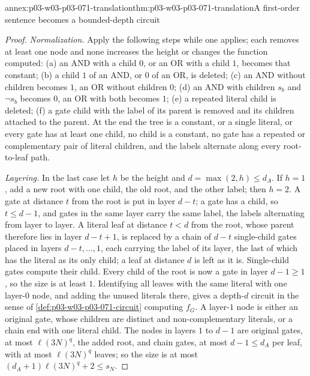 \begin{annexitem}{annex:p03-w03-p03-071-translation}{thm:p03-w03-p03-071-translation}{A first-order sentence becomes a bounded-depth circuit}
\begin{proof}
\emph{Normalization.}  Apply the following steps while one applies; each
removes at least one node and none increases the height or changes the
function computed: (a) an AND with a child \(0\), or an OR with a child
\(1\), becomes that constant; (b) a child \(1\) of an AND, or \(0\) of an OR,
is deleted; (c) an AND without children becomes \(1\), an OR without
children \(0\); (d) an AND with children \(s_b\) and \(\neg s_b\) becomes
\(0\), an OR with both becomes \(1\); (e) a repeated literal child is
deleted; (f) a gate child with the label of its parent is removed and its
children attached to the parent.  At the end the tree is a constant, or a
single literal, or every gate has at least one child, no child is a
constant, no gate has a repeated or complementary pair of literal children,
and the labels alternate along every root-to-leaf path.

\emph{Layering.}  In the last case let \(h\) be the height and
\(d=\max(2,h)\leq d_A\).  If \(h=1\), add a new root with one child, the old
root, and the other label; then \(h=2\).  A gate at distance \(t\) from the
root is put in layer \(d-t\); a gate has a child, so \(t\leq d-1\), and
gates in the same layer carry the same label, the labels alternating from
layer to layer.  A literal leaf at distance \(t<d\) from the root, whose
parent therefore lies in layer \(d-t+1\), is replaced by a chain of \(d-t\)
single-child gates placed in layers \(d-t,\ldots,1\), each carrying the
label of its layer, the last of which has the literal as its only child; a
leaf at distance \(d\) is left as it is.  Single-child gates compute their
child.  Every child of the root is now a gate in layer \(d-1\geq1\), so the
size is at least \(1\).  Identifying all leaves with the same literal with one layer-\(0\)
node, and adding the unused literals there, gives a depth-\(d\) circuit in
the sense of \cref{def:p03-w03-p03-071-circuit} computing \(f_G\).  A
layer-\(1\) node is either an original gate, whose children are distinct and
non-complementary literals, or a chain end with one literal child.  The
nodes in layers \(1\) to \(d-1\) are original gates, at most \(\ell(3N)^q\),
the added root, and chain gates, at most \(d-1\leq d_A\) per leaf, with at
most \(\ell(3N)^q\) leaves; so the size is at most
\((d_A+1)\ell(3N)^q+2\leq s_N\).
\end{proof}
\end{annexitem}

